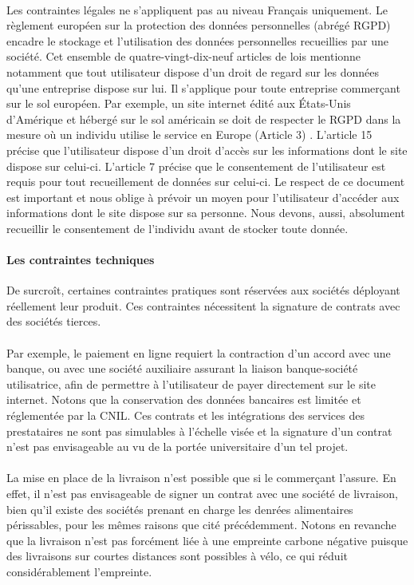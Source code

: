 \documentclass[a4paper, 12pt]{article}
\begin{document}
\paragraph{}Les contraintes légales ne s’appliquent pas au niveau Français uniquement. Le règlement européen sur la protection des données personnelles (abrégé RGPD) encadre le stockage et l’utilisation des données personnelles recueillies par une société. Cet ensemble de quatre-vingt-dix-neuf articles de lois mentionne notamment que tout utilisateur dispose d’un droit de regard sur les données qu’une entreprise dispose sur lui. Il s’applique pour toute entreprise commerçant sur le sol européen.  Par exemple, un site internet édité aux États-Unis d’Amérique et hébergé sur le sol américain se doit de respecter le RGPD dans la mesure où un individu utilise le service en Europe (Article 3) \cite{rgpd} . L’article 15 précise que l’utilisateur dispose d’un droit d’accès sur les informations dont le site dispose sur celui-ci. L’article 7 précise que le consentement de l’utilisateur est requis pour tout recueillement de données sur celui-ci. Le respect de ce document est important et nous oblige à prévoir un moyen pour l’utilisateur d’accéder aux informations dont le site dispose sur sa personne. Nous devons, aussi, absolument recueillir le consentement de l’individu avant de stocker toute donnée.
\paragraph{Les contraintes techniques}De surcroît, certaines contraintes pratiques sont réservées aux sociétés déployant réellement leur produit. Ces contraintes nécessitent la signature de contrats avec des sociétés tierces.
\paragraph{}Par exemple, le paiement en ligne requiert la contraction d’un accord avec une banque, ou avec une société auxiliaire assurant la liaison banque-société utilisatrice, afin de permettre à l’utilisateur de payer directement sur le site internet. Notons que la conservation des données bancaires est limitée et réglementée par la CNIL. \cite{payonline} Ces contrats et les intégrations des services des prestataires ne sont pas simulables à l’échelle visée et la signature d’un contrat n’est pas envisageable au vu de la portée universitaire d’un tel projet.
\paragraph{}La mise en place de la livraison n’est possible que si le commerçant l’assure. En effet, il n’est pas envisageable de signer un contrat avec une société de livraison, bien qu’il existe des sociétés prenant en charge les denrées alimentaires périssables, pour les mêmes raisons que cité précédemment. Notons en revanche que la livraison n’est pas forcément liée à une empreinte carbone négative puisque des livraisons sur courtes distances sont possibles à vélo, ce qui réduit considérablement l'empreinte.
\end{document}
